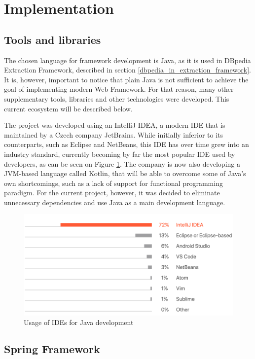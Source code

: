 \documentclass[thesis=M,english,hidelinks]{FITthesis}[2019/12/23]
\begin{document}
\section{Implementation}

\subsection{Tools and libraries}

The chosen language for framework development is Java, as it is used in DBpedia Extraction Framework, described in section \ref{dbpedia_in_extraction_framework}. It is, however, important to notice that plain Java is not sufficient to achieve the goal of implementing modern Web Framework. For that reason, many other supplementary tools, libraries and other technologies were developed. This current ecosystem will be described below.

The project was developed using an IntelliJ IDEA\cite{intellij_link}, a modern  \gls{IDE} that is maintained by a Czech company JetBrains. While initially inferior to its counterparts, such as Eclipse and NetBeans, this \gls{IDE} has over time grew into an industry standard, currently becoming by far the most popular \gls{IDE} used by developers\cite{java_dev_ecosystem}, as can be seen on Figure \ref{fig:idepollresults}. The company is now also developing a JVM-based language called Kotlin, that will be able to overcome some of Java's own shortcomings, such as a lack of support for functional programming paradigm. For the current project, however, it was decided to eliminate unnecessary dependencies and use Java as a main development language. 

\begin{figure}
	\centering
	\includegraphics[width=0.7\linewidth]{ide_poll_results}
	\caption{Usage of IDEs for Java development}
	\label{fig:idepollresults}
\end{figure}

\subsection{Spring Framework}
\end{document}
